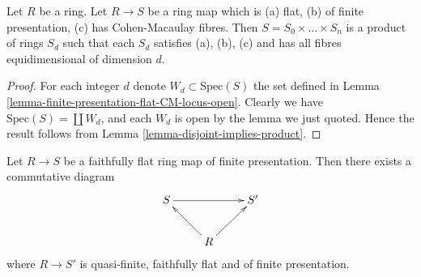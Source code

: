 \begin{lemma}
\label{lemma-relative-dimension-CM}
Let $R$ be a ring. Let $R \to S$ be a ring map
which is (a) flat, (b) of finite presentation, (c) has
Cohen-Macaulay fibres. Then $S = S_0 \times \ldots \times S_n$
is a product of rings $S_d$ such that each $S_d$ satisfies
(a), (b), (c) and has all fibres equidimensional of dimension $d$.
\end{lemma}

\begin{proof}
For each integer $d$ denote $W_d \subset \text{Spec}(S)$ the set
defined in Lemma \ref{lemma-finite-presentation-flat-CM-locus-open}.
Clearly we have $\text{Spec}(S) = \coprod W_d$, and each $W_d$
is open by the lemma we just quoted. Hence the result follows
from Lemma \ref{lemma-disjoint-implies-product}.
\end{proof}

\begin{lemma}
\label{lemma-fppf-fpqf}
Let $R \to S$ be a faithfully flat ring map of finite presentation.
Then there exists a commutative diagram
$$
\xymatrix{
S \ar[rr] & & S' \\
& R \ar[lu] \ar[ru]
}
$$
where $R \to S'$ is quasi-finite, faithfully flat and of finite presentation.
\end{lemma}

